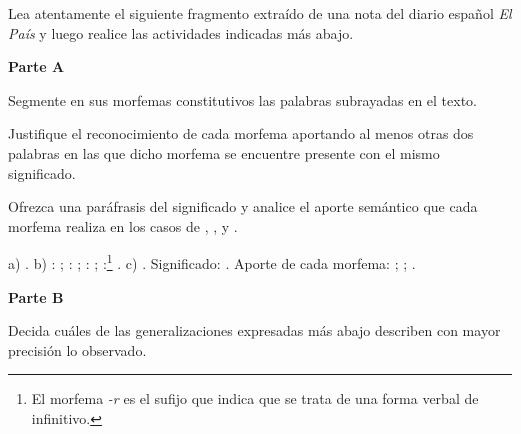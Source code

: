 \begin{ejercicio}[Terraplanistas]\label{ej:04-terraplanista}
Lea atentamente el siguiente fragmento extraído de una nota del diario español
\textit{El País} y luego realice las actividades indicadas más abajo.


\textbf{Parte A}
\begin{consignas}
  \item Segmente en sus morfemas constitutivos las palabras subrayadas en el
        texto.
  \item Justifique el reconocimiento de cada morfema aportando al menos otras
        dos palabras en las que dicho morfema se encuentre presente con el mismo
        significado.
  \item Ofrezca una paráfrasis del significado y analice el aporte semántico que
        cada morfema realiza en los casos de ,
        ,  y .
\end{consignas}

\begin{resuelto}
a) . b) : ;
: ; : ; :\footnote{El morfema \textit{-r} es el sufijo que
indica que se trata de una forma verbal de infinitivo.} . c) . Significado: . Aporte de cada morfema:  ;  ;  .
\end{resuelto}

\textbf{Parte B}

Decida cuáles de las generalizaciones expresadas más abajo describen con mayor
precisión lo observado.


\end{ejercicio}

